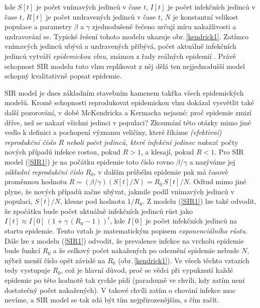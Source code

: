 kde $S[t]$ je počet vnímavých jedinců v čase $t$, $I[t]$ je počet infekčních jedinců v čase $t$, $R[t]$ je počet uzdravených jedinců v čase $t$, $N$ je konstantní velikost populace a parametry $\beta$ a $\gamma$ zjednodušeně řečeno určují míru nakažlivosti a uzdravování se. Typické řešení tohoto modelu ukazuje obr.\,\ref{kendrick1}. Zatímco vnímavých jedinců ubývá a uzdravených přibývá, počet aktuálně infekčních jedinců vytváří \emph{epidemickou vlnu}, známou z řady reálných epidemií \cite{Bell_etal2016,Finger_etal2019}. Právě schopnost SIR modelu tuto vlnu replikovat z něj dělá ten nejjednodušší model schopný kvalitativně popsat epidemie.  

SIR model je dnes základním stavebním kamenem takřka všech epidemických modelů. Kromě schopnosti reprodukovat epidemickou vlnu dokázal vysvětlit také další pozorování, v době McKendricka a Kermacka nejasné: proč epidemie zmizí dříve, než se nakazí všichni jedinci v populaci? Zkoumání této otázky mimo jiné vedlo k definici a pochopení významu veličiny, které říkáme \emph{(efektivní) reprodukční číslo $R$ neboli počet jedinců, které infekční jedinec nakazí}: počty nových případů infekce rostou, pokud $R>1$, a klesají, pokud $R<1$. Pro SIR model (\ref{SIR1}) je na počátku epidemie toto číslo rovno $\beta/\gamma$ a nazýváme jej \emph{základní reprodukční číslo} $R_0$, v dalším průběhu epidemie pak má časově proměnnou hodnotu $R = (\beta/\gamma)(S[t]/N) = R_0 \,S[t] / N$. Odtud mimo jiné plyne, že nových případů začne ubývat, jakmile podíl vnímavých jedinců v populaci, $S[t]/N$, klesne pod hodnotu $1/R_0$. Z modelu (\ref{SIR1}) lze také odvodit, že zpočátku bude počet aktuálně infekčních jedinců růst jako $I[t] \approx I[0]\,(1+\gamma\,(R_0-1))^t$, kde $I[0]$ je počet infekčních jedinců na startu epidemie. Tento vztah je matematickým popisem \emph{exponenciálního růstu}. Dále lze z modelu (\ref{SIR1}) odvodit, že prevalence infekce na vrcholu epidemie bude funkcí $R_0$ a že celkový počet nakažených po odeznění epidemie nebude $N$, nýbrž menší číslo opět závislé na $R_0$ (obr.\,\ref{kendrick1}). Ve všech těchto vztazích tedy vystupuje $R_0$, což je hlavní důvod, proč se vědci při vypuknutí každé epidemie po této hodnotě tak rychle pídí (paradoxně ve chvíli, kdy zatím není dostatečný počet nakažených). V takové chvíli zatím o chování infekce moc nevíme, a SIR model se tak zdá být tím nejpřirozenějším, s čím začít. 

